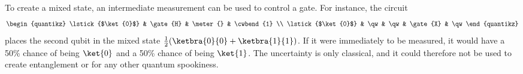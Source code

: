 To create a mixed state, an intermediate measurement can be used to control a gate.
For instance, the circuit
\begin{equation}
    \begin{quantikz}
        \lstick{$\ket{0}$} & \gate{H} & \meter{} & \cwbend{1} \\
        \lstick{$\ket{0}$} & \qw & \qw & \gate{X} & \qw
    \end{quantikz}
\end{equation}
places the second qubit in the mixed state $\frac{1}{2}(\ketbra{0}{0} + \ketbra{1}{1})$.
If it were immediately to be measured, it would have a 50\% chance of being $\ket{0}$ and a 50\% chance of being $\ket{1}$.
The uncertainty is only classical, and it could therefore not be used to create entanglement or for any other quantum spookiness.
